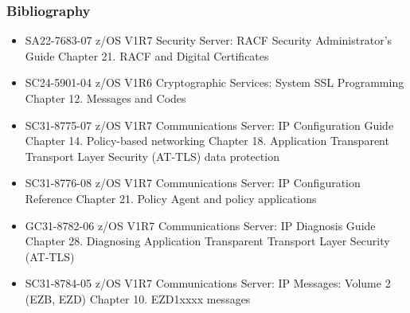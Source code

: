 \documentclass[letterpaper,10pt,english]{sphinxmanual}
\begin{document}
\subsubsection{Bibliography}
\label{\detokenize{Customization:bibliography}}\begin{itemize}
\item {} 
SA22-7683-07 z/OS V1R7 Security Server: RACF Security Administrator’s Guide Chapter 21. RACF and Digital Certificates

\item {} 
SC24-5901-04 z/OS V1R6 Cryptographic Services: System SSL Programming Chapter 12. Messages and Codes

\item {} 
SC31-8775-07 z/OS V1R7 Communications Server: IP Configuration Guide Chapter 14. Policy-based networking Chapter 18. Application Transparent Transport Layer Security (AT-TLS) data protection

\item {} 
SC31-8776-08 z/OS V1R7 Communications Server: IP Configuration Reference Chapter 21. Policy Agent and policy applications

\item {} 
GC31-8782-06 z/OS V1R7 Communications Server: IP Diagnosis Guide Chapter 28. Diagnosing Application Transparent Transport Layer Security (AT-TLS)

\item {} 
SC31-8784-05 z/OS V1R7 Communications Server: IP Messages: Volume 2 (EZB, EZD) Chapter 10. EZD1xxxx messages

\end{itemize}

\ignorespaces 
\end{document}

